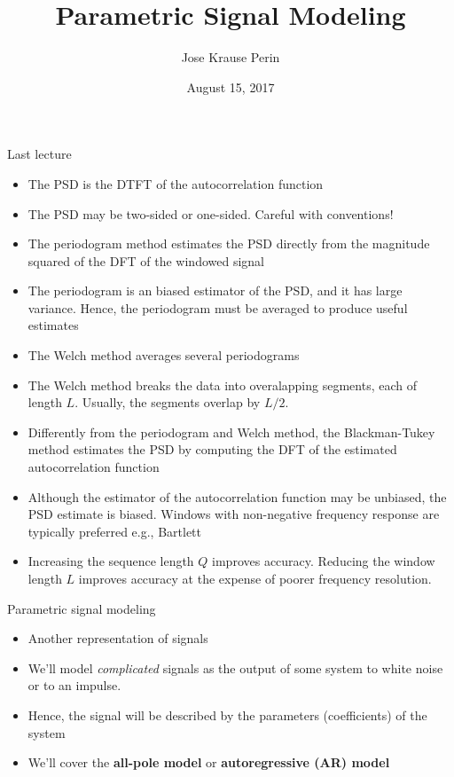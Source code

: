 \documentclass[10pt]{beamer}
\title[EE 264]{Parametric Signal Modeling}
\author{Jose Krause Perin}
\institute{Stanford University}
\date{August 15, 2017}
\begin{document}
\begin{frame}
  \titlepage
\end{frame}

%
\begin{frame}{Last lecture}
	\begin{itemize}
	\item The PSD is the DTFT of the autocorrelation function
	\item The PSD may be two-sided or one-sided. Careful with conventions!
	\item The periodogram method estimates the PSD directly from the magnitude squared of the DFT of the windowed signal
	\item The periodogram is an biased estimator of the PSD, and it has large variance. Hence, the periodogram must be averaged to produce useful estimates
	\item The Welch method averages several periodograms
	\item The Welch method breaks the data into overalapping segments, each of length $L$. Usually, the segments overlap by $L/2$.
	\item Differently from the periodogram and Welch method, the Blackman-Tukey method estimates the PSD by computing the DFT of the estimated autocorrelation function
	\item Although the estimator of the autocorrelation function may be unbiased, the PSD estimate is biased. Windows with non-negative frequency response are typically preferred e.g., Bartlett
	\item Increasing the sequence length $Q$ improves accuracy. Reducing the window length $L$ improves accuracy at the expense of poorer frequency resolution.
\end{itemize}
\end{frame}

%
\begin{frame}{Parametric signal modeling}
	\begin{itemize}
		\item Another representation of signals
		\item We'll model \textit{complicated} signals as the output of some system to white noise or to an impulse.
		\item Hence, the signal will be described by the parameters (coefficients) of the system
		\item We'll cover the \textbf{all-pole model} or \textbf{autoregressive (AR) model}
	\end{itemize}
\end{frame}
\end{document}
